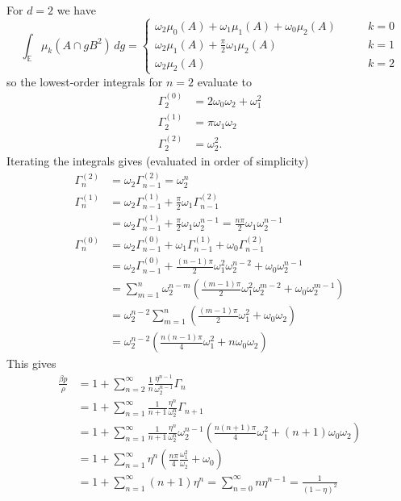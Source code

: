 \documentclass[12pt]{report}
\begin{document}
For $d=2$ we have
\begin{equation}
  \int_{\mathbb{E}} \mu_k (A \cap g B^2) \, dg =
  \begin{cases}
    \omega_2 \mu_0(A) + \omega_1 \mu_1(A) + \omega_0 \mu_2(A) & \qquad k=0 \\
    \omega_2 \mu_1(A) + \frac{\pi}{2} \omega_1 \mu_2(A) & \qquad k=1 \\
    \omega_2 \mu_2(A) & \qquad k=2
  \end{cases}
\end{equation}
so the lowest-order integrals for $n=2$ evaluate to
\begin{align}
  \Gamma_2^{(0)} &= 2 \omega_0 \omega_2 + \omega_1^2 \\
  \Gamma_2^{(1)} &= \pi \omega_1 \omega_2 \\
  \Gamma_2^{(2)} &= \omega_2^2.
\end{align}
Iterating the integrals gives (evaluated in order of simplicity)
\begin{align}
  \Gamma_n^{(2)} &=
  \omega_2 \Gamma_{n-1}^{(2)}
  = \omega_2^n \\
  \Gamma_n^{(1)} &=
  \omega_2 \Gamma_{n-1}^{(1)}
  + \frac{\pi}{2} \omega_1 \Gamma_{n-1}^{(2)}
  \nonumber \\ &=
  \omega_2 \Gamma_{n-1}^{(1)}
  + \frac{\pi}{2} \omega_1 \omega_2^{n-1}
  = \frac{n \pi}{2} \omega_1 \omega_2^{n-1} \\
  \Gamma_n^{(0)} &=
  \omega_2 \Gamma_{n-1}^{(0)}
  + \omega_1 \Gamma_{n-1}^{(1)}
  + \omega_0 \Gamma_{n-1}^{(2)}
  \nonumber \\ &=
  \omega_2 \Gamma_{n-1}^{(0)}
  + \frac{(n-1) \pi}{2} \omega_1^2 \omega_2^{n-2}
  + \omega_0 \omega_2^{n-1}
  \nonumber \\ &=
  \sum_{m=1}^n \omega_2^{n-m} \left(
  \frac{(m-1)\pi}{2} \omega_1^2 \omega_2^{m-2}
  + \omega_0 \omega_2^{m-1}
  \right)
  \nonumber \\ &=
  \omega_2^{n-2}
  \sum_{m=1}^n \left(
  \frac{(m-1)\pi}{2} \omega_1^2
  + \omega_0 \omega_2
  \right)
  \nonumber \\ &=
  \omega_2^{n-2}
  \left(
  \frac{n(n-1)\pi}{4} \omega_1^2
  + n \omega_0 \omega_2
  \right)
\end{align}
This gives
\begin{equation}
  \begin{split}
    \frac{\beta p}{\rho} &=
    1 + \sum_{n=2}^\infty \frac{1}{n} \frac{\eta^{n-1}}{\omega_2^{n-1}} \Gamma_n
    \\ &=
    1 + \sum_{n=1}^\infty \frac{1}{n+1} \frac{\eta^n}{\omega_2^n} \Gamma_{n+1}
    \\ &=
    1 + \sum_{n=1}^\infty \frac{1}{n+1} \frac{\eta^n}{\omega_2^n}
    \omega_2^{n-1}
    \left(
    \frac{n(n+1)\pi}{4} \omega_1^2
    + (n+1) \omega_0 \omega_2
    \right)
    \\ &=
    1 + \sum_{n=1}^\infty \eta^n
    \left(
    \frac{n\pi}{4} \frac{\omega_1^2}{\omega_2}
    + \omega_0
    \right)
    \\ &=
    1 + \sum_{n=1}^\infty (n+1) \eta^n =
    \sum_{n=0}^\infty n \eta^{n-1}
    = \frac{1}{(1-\eta)^2}
  \end{split}
\end{equation}
\end{document}
